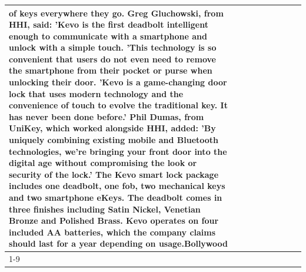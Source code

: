 \begin{table}[H]
\begin{tabular}{lllrlllll}
of keys everywhere they go. Greg Gluchowski, from HHI, said: 'Kevo is the first deadbolt intelligent enough to communicate with a smartphone and unlock with a simple touch. 'This technology is so convenient that users do not even need to remove the smartphone from their pocket or purse when unlocking their door. 'Kevo is a game-changing door lock that uses modern technology and the convenience of touch to evolve the traditional key. It has never been done before.' Phil Dumas, from UniKey, which worked alongside HHI, added: 'By uniquely combining existing mobile and Bluetooth technologies, we’re bringing your front door into the digital age without compromising the look or security of the lock.' The Kevo smart lock package includes one deadbolt, one fob, two mechanical keys and two smartphone eKeys. The deadbolt comes in three finishes including Satin Nickel, Venetian Bronze and Polished Brass. Kevo operates on four included AA batteries, which the company claims should last for a year depending on usage.Bollywood \\
\cline{1-9}

\end{tabular}
\end{table}
